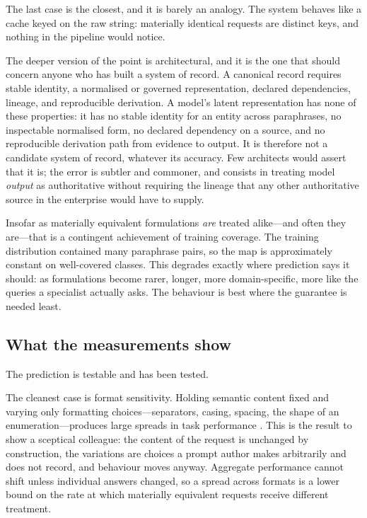 The last case is the closest, and it is barely an analogy. The system behaves like a
cache keyed on the raw string: materially identical requests are distinct keys, and
nothing in the pipeline would notice.

The deeper version of the point is architectural, and it is the one that should
concern anyone who has built a system of record. A canonical record requires stable
identity, a normalised or governed representation, declared dependencies, lineage,
and reproducible derivation. A model's latent representation has none of these
properties: it has no stable identity for an entity across paraphrases, no
inspectable normalised form, no declared dependency on a source, and no reproducible
derivation path from evidence to output. It is therefore not a candidate system of
record, whatever its accuracy. Few architects would assert that it is; the error is
subtler and commoner, and consists in treating model \emph{output} as authoritative
without requiring the lineage that any other authoritative source in the enterprise
would have to supply.

Insofar as materially equivalent formulations \emph{are} treated alike---and often
they are---that is a contingent achievement of training coverage. The training
distribution contained many paraphrase pairs, so the map is approximately constant
on well-covered classes. This degrades exactly where prediction says it should: as
formulations become rarer, longer, more domain-specific, more like the queries a
specialist actually asks. The behaviour is best where the guarantee is needed
least.

\subsection{What the measurements show}

The prediction is testable and has been tested.

The cleanest case is format sensitivity. Holding semantic content fixed
and varying only formatting choices---separators, casing, spacing, the shape of an
enumeration---produces large spreads in task performance \citep{sclar2024}. This is
the result to show a sceptical colleague: the content of the request is unchanged by
construction, the variations are choices a prompt author makes arbitrarily and does
not record, and behaviour moves anyway. Aggregate performance cannot shift unless
individual answers changed, so a spread across formats is a lower bound on the rate
at which materially equivalent requests receive different treatment.


